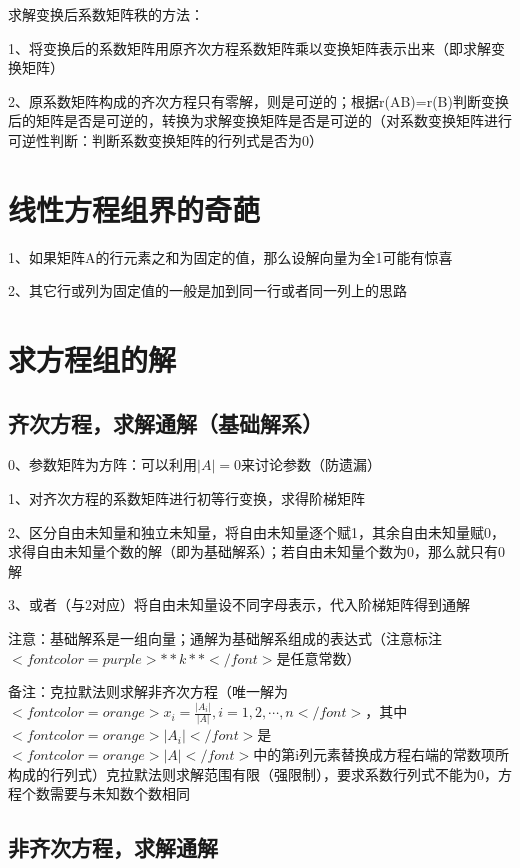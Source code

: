 求解变换后系数矩阵秩的方法：

1、将变换后的系数矩阵用原齐次方程系数矩阵乘以变换矩阵表示出来（即求解变换矩阵）

2、原系数矩阵构成的齐次方程只有零解，则是可逆的；根据r(AB)=r(B)判断变换后的矩阵是否是可逆的，转换为求解变换矩阵是否是可逆的（对系数变换矩阵进行可逆性判断：判断系数变换矩阵的行列式是否为0）

\section{线性方程组界的奇葩}

1、如果矩阵A的行元素之和为固定的值，那么设解向量为全1可能有惊喜

2、其它行或列为固定值的一般是加到同一行或者同一列上的思路

\section{求方程组的解}



\subsection{齐次方程，求解通解（基础解系）}

0、参数矩阵为方阵：可以利用$ |A| = 0 $来讨论参数（防遗漏）

1、对齐次方程的系数矩阵进行初等行变换，求得阶梯矩阵

2、区分自由未知量和独立未知量，将自由未知量逐个赋1，其余自由未知量赋0，求得自由未知量个数的解（即为基础解系）；若自由未知量个数为0，那么就只有0解

3、或者（与2对应）将自由未知量设不同字母表示，代入阶梯矩阵得到通解

注意：基础解系是一组向量；通解为基础解系组成的表达式（注意标注$ <font color=purple>**k**</font> $是任意常数）

备注：克拉默法则求解非齐次方程（唯一解为$ <font color=orange>x_i = \frac {|A_i|}{|A|},i=1,2,\cdots, n</font> $，其中$ <font color=orange>|A_i|</font> $是$ <font color=orange>|A|</font> $中的第i列元素替换成方程右端的常数项所构成的行列式）克拉默法则求解范围有限（强限制），要求系数行列式不能为0，方程个数需要与未知数个数相同



\subsection{非齐次方程，求解通解}

